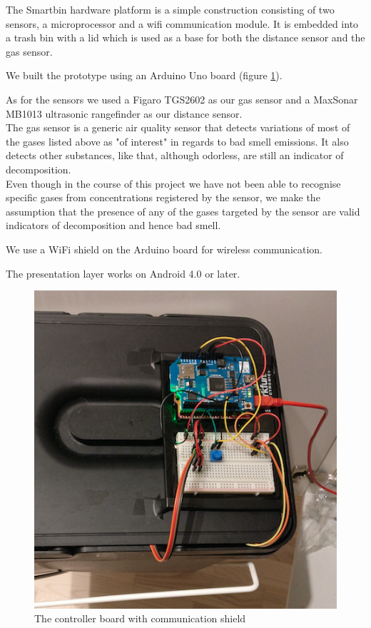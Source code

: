 The Smartbin hardware platform is a simple construction consisting of two sensors, a microprocessor and a wifi communication module. It is embedded into a trash bin with a lid which is used
as a base for both the distance sensor and the gas sensor.

We built the prototype using an Arduino Uno board (figure \ref{fig:board}).

 As for the sensors we used a Figaro TGS2602 as our gas sensor and a MaxSonar MB1013 ultrasonic rangefinder as our distance sensor.\\
The gas sensor is a generic air quality sensor that detects variations of most of the gases listed above as "of interest" in regards to bad smell emissions.
It also detects other substances, like   that, although odorless, are still an indicator of decomposition.\\
Even though in the course of this project we have not been able to recognise specific gases from  concentrations registered by the sensor, we make the assumption that the presence of any of the gases targeted by the sensor are valid indicators of decomposition and hence bad smell.

We use a WiFi shield on the Arduino board for wireless communication.

The presentation layer works on Android 4.0 or later.

\begin{figure}
\centering
\includegraphics[scale=.3]{img/arduinoboard}
\caption{The controller board with communication shield}
\label{fig:board}
\end{figure}